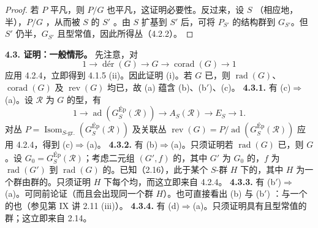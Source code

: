 \begin{proof}
若 $P$ 平凡，则 $P/G$ 也平凡，这证明必要性。反过来，设 $S$ （相应地，半），$P/G$ ，从而被 $S$ 的 $S'$ 。由 $S$ 扩基到 $S'$ 后，可将 $P_{S'}$ 的结构群到 $G_{S'}$。但 $S'$ 仍半，$G_{S'}$ 且型常值，因此所得丛（4.2.2）。
\end{proof}
\textbf{4.3. 证明：一般情形。} 先注意，对
\[1\longrightarrow\operatorname{dér}(G)\longrightarrow G\longrightarrow\operatorname{corad}(G)\longrightarrow1\]
应用 4.2.4，立即得到 4.1.5 (ii)。因此证明 (i)。若 $G$ 已，则 $\operatorname{rad}(G)$、$\operatorname{corad}(G)$ 及 $\operatorname{rev}(G)$ 均已，故 (a) 蕴含 (b)、(b$'$)、(c)。
\textbf{4.3.1.} 有 (c)$\Rightarrow$(a)。设 $\mathcal R$ 为 $G$ 的型，有
\[1\longrightarrow\operatorname{ad}(G^{\mathrm{Ép}}_S(\mathcal R))\longrightarrow A_S(\mathcal R)\longrightarrow E_S\longrightarrow1.\]
对丛 $P=\operatorname{Isom}_{S\text{-gr.}}(G^{\mathrm{Ép}}_S(\mathcal R))$ 及关联丛 $\operatorname{rev}(G)=P/\operatorname{ad}(G^{\mathrm{Ép}}_S(\mathcal R))$ 应用 4.2.4，得到 (c)$\Rightarrow$(a)。
\textbf{4.3.2.} 有 (b)$\Rightarrow$(a)。只须证明若 $\operatorname{rad}(G)$ 已，则 $G$ 。设 $G_0=G^{\mathrm{Ép}}_S(\mathcal R)$；考虑二元组 $(G',f)$ 的，其中 $G'$ 为 $G_0$ 的，$f$ 为 $\operatorname{rad}(G')$ 到 $\operatorname{rad}(G)$ 的。已知（2.16），此于某个 $S$-群 $H$ 下的，其中 $H$ 为一个群由群的。只须证明 $H$ 下每个均，而这立即来自 4.2.4。
\textbf{4.3.3.} 有 (b$'$)$\Rightarrow$(a)。可同前论证（而且会出现同一个群 $H$）。也可直接看出 (b) 与 (b$'$) ：与一个的也（参见第 IX 讲 2.11 (iii)）。
\textbf{4.3.4.} 有 (d)$\Rightarrow$(a)。只须证明具有且型常值的群；这立即来自 2.14。

